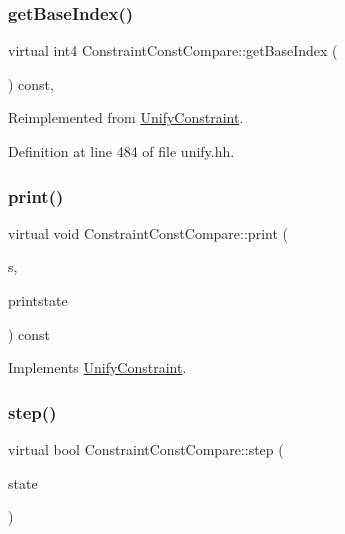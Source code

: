 \subsubsection{\texorpdfstring{getBaseIndex()}{getBaseIndex()}}
{\footnotesize\ttfamily virtual int4 Constraint\+Const\+Compare\+::get\+Base\+Index (\begin{DoxyParamCaption}\item[{void}]{ }\end{DoxyParamCaption}) const\hspace{0.3cm}{\ttfamily [inline]}, {\ttfamily [virtual]}}



Reimplemented from \mbox{\hyperlink{class_unify_constraint_a44f0164f38ac1fdc44fc73ebe7678de1}{Unify\+Constraint}}.



Definition at line 484 of file unify.\+hh.

\mbox{\label{class_constraint_const_compare_a7b46d6503d830e7abea5bbed14cde0d5}} 
\subsubsection{\texorpdfstring{print()}{print()}}
{\footnotesize\ttfamily virtual void Constraint\+Const\+Compare\+::print (\begin{DoxyParamCaption}\item[{ostream \&}]{s,  }\item[{\mbox{\hyperlink{class_unify_c_printer}{Unify\+C\+Printer}} \&}]{printstate }\end{DoxyParamCaption}) const\hspace{0.3cm}{\ttfamily [virtual]}}



Implements \mbox{\hyperlink{class_unify_constraint_a774f6a611a96384766cb8e8d8f5ff41f}{Unify\+Constraint}}.

\mbox{\label{class_constraint_const_compare_abbb5ae34af8b206328c9dd9147fd6824}} 
\subsubsection{\texorpdfstring{step()}{step()}}
{\footnotesize\ttfamily virtual bool Constraint\+Const\+Compare\+::step (\begin{DoxyParamCaption}\item[{\mbox{\hyperlink{class_unify_state}{Unify\+State}} \&}]{state }\end{DoxyParamCaption})\hspace{0.3cm}{\ttfamily [virtual]}}



